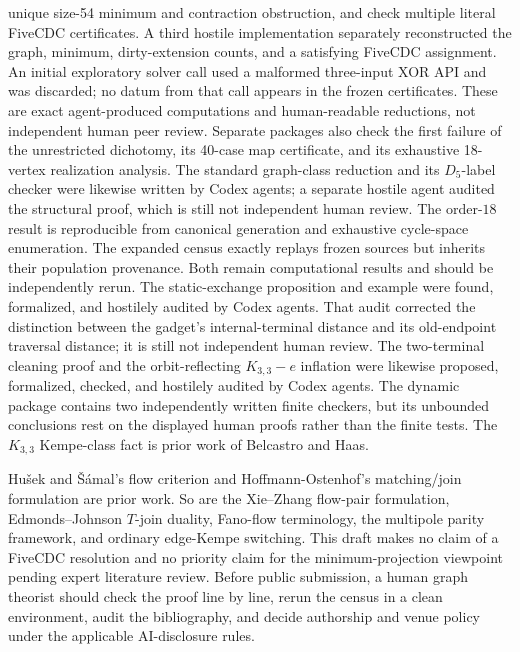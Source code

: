 \documentclass[11pt]{article}
\theoremstyle{definition}
\theoremstyle{remark}
\begin{document}
unique size-54 minimum and contraction obstruction, and check multiple
literal FiveCDC certificates.  A third hostile implementation separately
reconstructed the graph, minimum, dirty-extension counts, and a satisfying
FiveCDC assignment.  An initial exploratory solver call used a malformed
three-input XOR API and was discarded; no datum from that call appears in
the frozen certificates.  These are exact agent-produced computations and
human-readable reductions, not independent human peer review.
Separate packages also check the first failure of the unrestricted
dichotomy, its 40-case map certificate, and its exhaustive 18-vertex
realization analysis.  The standard graph-class reduction and its
\(D_5\)-label checker were likewise written by Codex agents; a separate
hostile agent audited the structural proof, which is still not independent
human review.
The order-\(18\) result is
reproducible from canonical generation and exhaustive cycle-space
enumeration.  The expanded census exactly replays frozen sources but
inherits their population provenance.  Both remain computational results
and should be independently rerun.
The static-exchange proposition and example were found, formalized, and
hostilely audited by Codex agents.  That audit corrected the distinction
between the gadget's internal-terminal distance and its old-endpoint
traversal distance; it is still not independent human review.
The two-terminal cleaning proof and the orbit-reflecting \(K_{3,3}-e\)
inflation were likewise proposed, formalized, checked, and hostilely
audited by Codex agents.  The dynamic package contains two independently
written finite checkers, but its unbounded conclusions rest on the
displayed human proofs rather than the finite tests.  The \(K_{3,3}\)
Kempe-class fact is prior work of Belcastro and Haas.

Hu\v{s}ek and \v{S}\'amal's flow criterion and
Hoffmann-Ostenhof's matching/join formulation are prior work.  So are the
Xie--Zhang flow-pair formulation, Edmonds--Johnson \(T\)-join duality,
Fano-flow terminology, the multipole parity framework, and ordinary
edge-Kempe switching.  This draft makes no claim of a FiveCDC resolution
and no priority claim for the minimum-projection viewpoint pending expert
literature review.  Before public submission, a human graph theorist
should check the proof line by line, rerun the census in a clean
environment, audit the bibliography, and decide authorship and venue
policy under the applicable AI-disclosure rules.

\small


\end{document}
